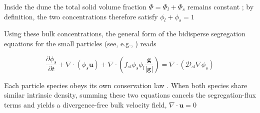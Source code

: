 \documentclass[lineno]{JFM-FLM_Au}
\begin{document}
Inside the dune the total solid volume fraction $\Phi = \Phi_l + \Phi_s$ remains constant \citep{bacik2020}; by definition, the two concentrations therefore satisfy $\phi_l + \phi_s = 1$

Using these bulk concentrations, the general form of the bidisperse segregation equations for the small particles (see, e.g., \citet{Gray2018}) reads

\begin{equation}
    \frac{\partial \phi_s}{\partial t} + \nabla \cdot (\phi_s \boldsymbol{u}) + \nabla \cdot \left( f_{sl} \phi_s \phi_l \frac{\boldsymbol{g}}{|\boldsymbol{g}|} \right) = \nabla \cdot (\mathcal{D}_{sl} \nabla \phi_s)
    \label{eq:OGformlarge}
\end{equation}

Each particle species obeys its own conservation law \citep{GajjarGray2014}. When both species share similar intrinsic density, summing these two equations cancels the segregation-flux terms and yields a divergence-free bulk velocity field, $\nabla \cdot \mathbf{u} = 0$
\end{document}
